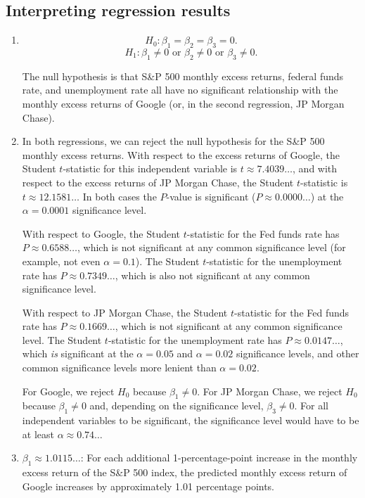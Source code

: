 \documentclass[12pt]{article}
\begin{document}
\subsection{Interpreting regression results}
\begin{enumerate}
\item
\[H_0:\beta_1=\beta_2=\beta_3=0.\]
\[H_1:\beta_1\neq 0\text{ or }\beta_2\neq 0\text{ or }\beta_3\neq 0.\]

The null hypothesis is that S\&P 500 monthly excess returns, federal funds rate, and unemployment rate all have no significant relationship with the monthly excess returns of Google (or, in the second regression, JP Morgan Chase).
\item In both regressions, we can reject the null hypothesis for the S\&P 500 monthly excess returns. With respect to the excess returns of Google, the Student $t$-statistic for this independent variable is $t\approx 7.4039\dots$, and with respect to the excess returns of JP Morgan Chase, the Student $t$-statistic is $t\approx 12.1581\dots$ In both cases the $P$-value is significant ($P\approx 0.0000\dots$) at the $\alpha=0.0001$ significance level.

With respect to Google, the Student $t$-statistic for the Fed funds rate has $P\approx 0.6588\dots$, which is not significant at any common significance level (for example, not even $\alpha=0.1$). The Student $t$-statistic for the unemployment rate has $P\approx 0.7349\dots$, which is also not significant at any common significance level.

With respect to JP Morgan Chase, the Student $t$-statistic for the Fed funds rate has $P\approx 0.1669\dots$, which is not significant at any common significance level. The Student $t$-statistic for the unemployment rate has $P\approx 0.0147\dots$, which \textit{is} significant at the $\alpha=0.05$ and $\alpha=0.02$ significance levels, and other common significance levels more lenient than $\alpha=0.02$.

For Google, we reject $H_0$ because $\beta_1\neq 0$. For JP Morgan Chase, we reject $H_0$ because $\beta_1\neq 0$ and, depending on the significance level, $\beta_3\neq 0$. For all independent variables to be significant, the significance level would have to be at least $\alpha\approx 0.74\dots$
\item
$\beta_1\approx 1.0115\dots$: For each additional 1-percentage-point increase in the monthly excess return of the S\&P 500 index, the predicted monthly excess return of Google increases by approximately 1.01 percentage points.


\end{enumerate}
\end{document}

